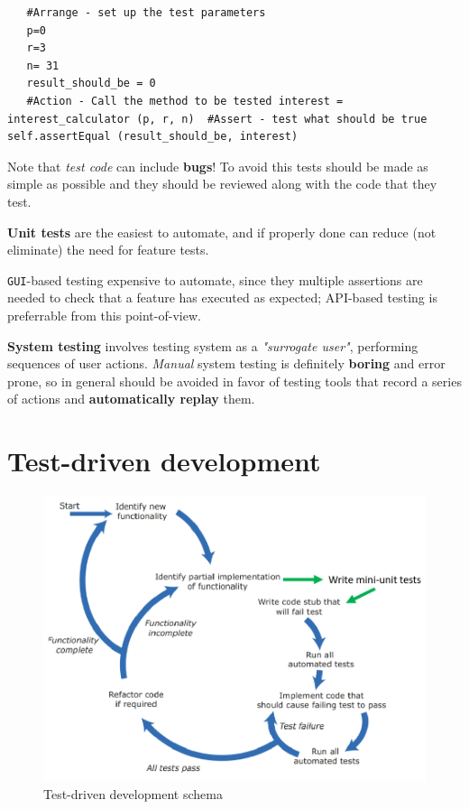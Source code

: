 \begin{lstlisting}
   #Arrange - set up the test parameters
   p=0
   r=3
   n= 31
   result_should_be = 0
   #Action - Call the method to be tested interest = interest_calculator (p, r, n)  #Assert - test what should be true self.assertEqual (result_should_be, interest)
\end{lstlisting}

Note that \textit{test code} can include \textbf{bugs}!
To avoid this tests should be made as simple as possible and they should be reviewed along with the code that they test.

\textbf{Unit tests} are the easiest to automate, and if properly done
can reduce (not eliminate) the need for feature tests.

\texttt{GUI}-based testing expensive to automate, since they multiple assertions are needed to check that a feature has executed as expected; API-based testing is preferrable from this point-of-view.

\textbf{System testing} involves testing system as a \textit{"surrogate user"}, performing  sequences of user actions.
\textit{Manual} system testing is definitely \textbf{boring} and error prone,
so in general should be avoided in favor of testing tools that record a series of actions and \textbf{automatically replay} them.

\section{Test-driven development}
\begin{figure}[htbp]
   \centering
   \includegraphics{images/testdriven.png}
   \caption{Test-driven development schema}
   \label{fig:testdriven}
\end{figure}

